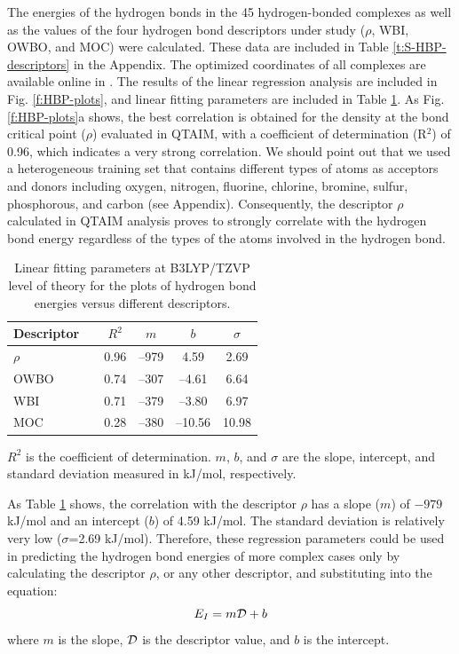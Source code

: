 \documentclass[11pt]{report}
\begin{document}
The energies of the hydrogen bonds in the 45 hydrogen-bonded complexes as well as the values of the four hydrogen bond descriptors under study ($\rho$, WBI, OWBO, and MOC) were calculated. 
These data are included in 
Table \ref{t:S-HBP-descriptors}
in the Appendix. The optimized coordinates of all
complexes are available online in \cite{Ayoub2014HB}.
The results of the linear regression analysis are included in
Fig. \ref{f:HBP-plots}, 
and linear fitting parameters are included in 
Table \ref{t:HBP-stat}. 
As Fig. \ref{f:HBP-plots}a shows, the best correlation is obtained for the density at the
bond critical point ($\rho$) evaluated in QTAIM, with a coefficient of determination (R$^2$) of 0.96, which indicates a very strong correlation. We should point out that we used a
heterogeneous training set that contains different types of atoms as acceptors and donors including oxygen, nitrogen, fluorine, chlorine, bromine, sulfur, phosphorous, and carbon
(see Appendix). 
Consequently, the descriptor $\rho$ calculated in QTAIM analysis proves to strongly correlate with the hydrogen bond energy regardless of the types of the atoms involved in the hydrogen bond.
\begin{table}
 \caption[Linear fitting parameters at B3LYP/TZVP]{Linear fitting parameters at B3LYP/TZVP level of theory for the plots of hydrogen bond energies versus different descriptors.}
 \label{t:HBP-stat}
 \centering
 \begin{tabular*}{\linewidth}{@{\extracolsep{\fill}}lccccc}
\toprule
 Descriptor && $R^{2}$ & $m$  & $b$  & $\sigma$ \\
\midrule
 $\rho$ && 0.96	& --979	& 4.59    & 2.69 \\
 OWBO	&& 0.74	& --307	& --4.61  & 6.64 \\
 WBI	&& 0.71	& --379 & --3.80  & 6.97 \\
 MOC	&& 0.28	& --380 & --10.56 & 10.98\\
\bottomrule
 \end{tabular*}
 \vspace{-0.45cm}
 \begin{flushleft}
 $R^2$ is the coefficient of determination. $m$, $b$, and $\sigma$ are the slope, intercept, and standard deviation measured in kJ/mol, respectively.
 \end{flushleft}
\end{table}
As Table
\ref{t:HBP-stat} 
shows, the correlation with the descriptor
$\rho$ has a slope ($m$) of $-979$ kJ/mol and an intercept ($b$) of 4.59 kJ/mol. 
The standard deviation is relatively very low
($\sigma$=2.69 kJ/mol). Therefore, these regression parameters could be used in predicting the hydrogen bond energies of more complex cases only by calculating the descriptor $\rho$, or any other descriptor, and substituting into the equation:
\begin{equation}
\label{eq:HBP-fit}
  E_{I} = m {\cal D} + b 
\end{equation}
where $m$ is the slope, $\cal D$ is the descriptor value, and $b$ is the intercept. 
\end{document}

